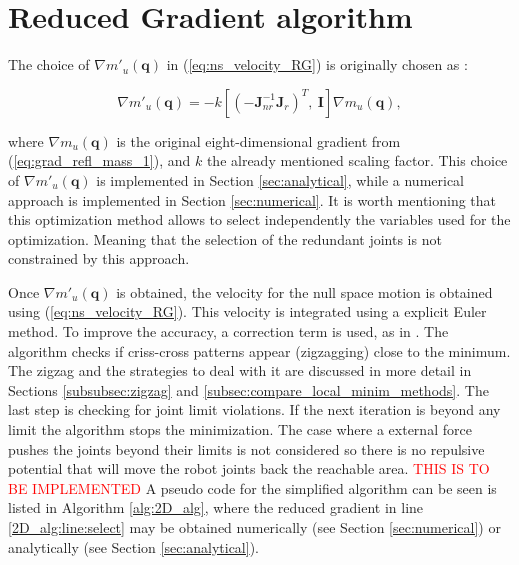 

 





	
	






 



\section{Reduced Gradient algorithm}
\label{sec:1D2D}


The choice of $\nabla m'_u(\mathbf{q})$  in (\ref{eq:ns_velocity_RG}) is originally  chosen as \cite{reduced_gradient}: 

\begin{equation}
 \nabla m'_u(\mathbf{q}) = - k \left[(-\mathbf{J}_{nr}^{-1} \mathbf{J}_r)^{T}, \   \mathbf{I} \right ] \nabla m_u(\mathbf{q})
 ,
\label{eq:RG_deLuca}
\end{equation}

where $\nabla m_u(\mathbf{q})$ is the original eight-dimensional gradient from  (\ref{eq:grad_refl_mass_1}), and $k$ the already mentioned scaling factor. This choice of $\nabla m'_u(\mathbf{q})$ is implemented in Section \ref{sec:analytical}, while a numerical approach is implemented in Section \ref{sec:numerical}. It is worth mentioning that this optimization method allows to select independently the variables used for the optimization. Meaning that the selection of the redundant joints is not constrained by this approach.


Once $\nabla m'_u(\mathbf{q})$ is obtained, the velocity for the null space motion is obtained using (\ref{eq:ns_velocity_RG}). This velocity is integrated using a explicit Euler method. To improve the accuracy, a correction term is used, as in \cite{fabianthesis}. The algorithm checks if criss-cross patterns appear (zigzagging) close to the minimum. The zigzag and the strategies to deal with it are discussed in more detail in Sections \ref{subsubsec:zigzag} and  \ref{subsec:compare_local_minim_methods}.
The last step is checking for joint limit violations. If the next iteration is beyond any limit the algorithm stops the  minimization. The case where a external force pushes the joints beyond their limits is not considered so there is no repulsive potential that will move the robot joints back the reachable area. \textcolor{red}{THIS IS TO BE IMPLEMENTED}
A pseudo code for the simplified algorithm can be seen is listed in Algorithm \ref{alg:2D_alg}, where the reduced gradient in line \ref{2D_alg:line:select} may be obtained numerically (see Section \ref{sec:numerical}) or analytically (see Section \ref{sec:analytical}). 


